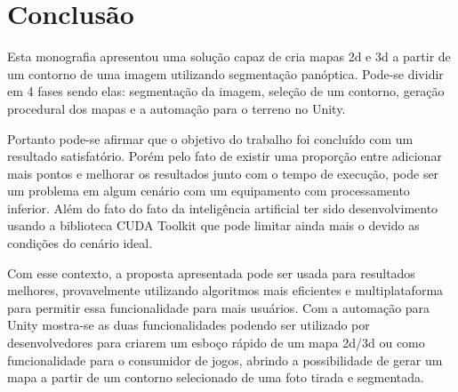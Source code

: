 \section{Conclusão}

Esta monografia apresentou uma solução capaz de cria mapas 2d e 3d a partir de um contorno de uma imagem utilizando segmentação panóptica. Pode-se dividir em 4 fases sendo elas: segmentação da imagem, seleção de um contorno, geração procedural dos mapas e a automação para o terreno no Unity.

Portanto pode-se afirmar que o objetivo do trabalho foi concluído com um resultado satisfatório. Porém pelo fato de existir uma proporção entre adicionar mais pontos e melhorar os resultados junto com o tempo de execução, pode ser um problema em algum cenário com um equipamento com processamento inferior. Além do fato do fato da inteligência artificial ter sido desenvolvimento usando a biblioteca CUDA Toolkit que pode limitar ainda mais o devido as condições do cenário ideal.

Com esse contexto, a proposta apresentada pode ser usada para resultados melhores, provavelmente utilizando algoritmos mais eficientes e multiplataforma para permitir essa funcionalidade para mais usuários. Com a automação para Unity mostra-se as duas funcionalidades podendo ser utilizado por desenvolvedores para criarem um esboço rápido de um mapa 2d/3d ou como funcionalidade para o consumidor de jogos, abrindo a possibilidade de gerar um mapa a partir de um contorno selecionado de uma foto tirada e segmentada.